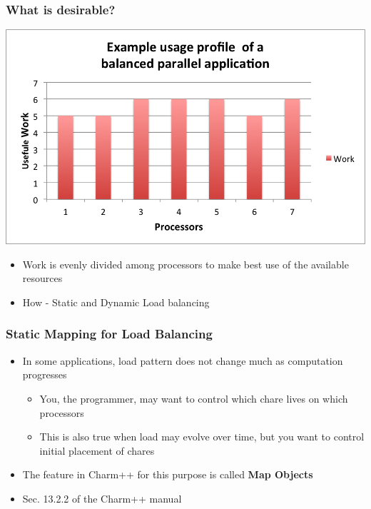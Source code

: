 \documentclass{beamer}
\begin{document}
\begin{frame}[fragile]
  \frametitle{What is desirable?}
  \centering
  \includegraphics[width=.7\textwidth]{cs598lvk/diagrams/balanced.png}
  \begin{itemize}
  \item Work is evenly divided among processors to make best use of the available resources
  \item How - Static and Dynamic Load balancing
  \end{itemize}
\end{frame}

\begin{frame}[fragile]
  \frametitle{Static Mapping for Load Balancing}
    \begin{itemize}
      \item In some applications, load pattern does not change much as computation progresses
      \begin{itemize}
        \item You, the programmer, may want to control which chare lives on which processors
        \item This is also true when  load may evolve over time, but you want to control initial placement of chares
      \end{itemize}
      \item The feature in Charm++ for this purpose is called \textbf{Map
      Objects}
      \item Sec. 13.2.2 of the Charm++ manual
    \end{itemize}
\end{frame}
\end{document}
